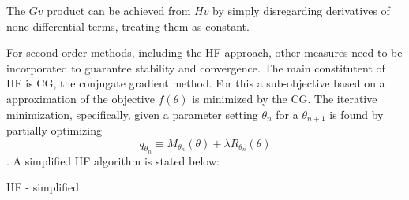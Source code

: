 The $Gv$ product can be achieved from $Hv$ by simply disregarding derivatives of none differential terms, treating them as constant.

For second order methods, including the HF approach, other measures need to be incorporated to guarantee stability and convergence. The main constitutent of HF is CG, the conjugate gradient method. For this a sub-objective based on a approximation of the objective $f(\theta)$ is minimized by the CG. The iterative minimization, specifically, given a parameter setting $\theta_n$ for a $\theta_{n+1}$ is found by partially optimizing \[q_{\theta_n} \equiv M_{\theta_n}(\theta) + \lambda R_{\theta_n}(\theta) \]. A simplified HF algorithm is stated below:

\begin{algorithm}
    \caption{HF - simplified}
    \begin{algorithmic}
        \EndFor
    \end{algorithmic}
\end{algorithm}